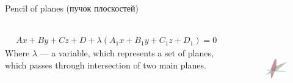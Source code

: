 \documentclass[aspectratio=169]{beamer}
\begin{document}
\begin{frame}[t]{Pencil of planes (пучок плоскостей)}
\framesubtitle{}
\begin{columns}[T,onlytextwidth]
    \begin{column}{0.49\textwidth}
        \begin{align*}
            Ax+By+Cz+D+\lambda(A_1x+B_1y+C_1z+D_1)=0
        \end{align*}
        Where $\lambda$ --- a variable, which represents a set of planes, which passes through intersection of two main planes.       
    \end{column}
    \begin{column}{0.49\textwidth}
            \begin{figure}[H]
        \href{https://www.geogebra.org/calculator/zthjne4v}{
            \centering\includegraphics[height=3cm,width=1\textwidth,keepaspectratio]{pencil_of_planes.png}}
        \label{fig:pencil_of_planes.png}
    \end{figure}
    \end{column}
\end{columns}

\end{frame}

\end{document}
